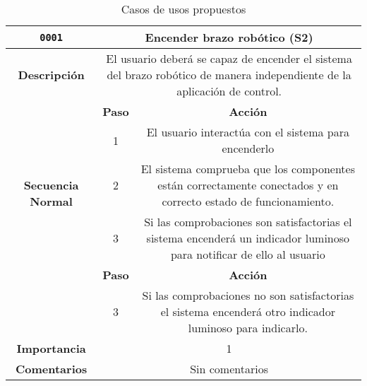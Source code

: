 \begin{table}[H]
    \centering
    \begin{tabular}{|c|c|c|}
        \hline
        \texttt{0001}                   & \multicolumn{2}{c|}{Encender brazo robótico (S2)}
        \\ \hline
        \textbf{Descripción}            & \multicolumn{2}{m{13cm}|}{El usuario deberá se capaz de encender el sistema del brazo robótico de manera independiente de la aplicación de control.} 
        \\ \hline
        \multirow{5}{*}{\textbf{Secuencia Normal}} & \textbf{Paso} & \textbf{Acción}              
        \\ \cline{2-3}                    &   1  & El usuario interactúa con el sistema para encenderlo
        \\ \cline{2-3}                    &   2  & El sistema comprueba que los componentes están correctamente conectados y en correcto estado de funcionamiento.                              
        \\ \cline{2-3}                    &   3  &  Si las comprobaciones son satisfactorias el sistema encenderá un indicador luminoso para notificar de ello al usuario
        \\ \hline
        \multirow{2}{*}{\textbf{Excepciones}}     & \textbf{Paso} &\textbf{Acción} 
        \\ \cline{2-3}                    &    3  & Si las comprobaciones no son satisfactorias el sistema encenderá otro indicador luminoso para indicarlo.
        \\ \hline
        \textbf{Importancia} & \multicolumn{2}{c|}{1}
        \\ \hline
        \textbf{Comentarios} & \multicolumn{2}{c|}{Sin comentarios}
        \\ \hline
    \end{tabular}
    \label{tab:use_cases}
    \caption{Casos de usos propuestos}
\end{table}

